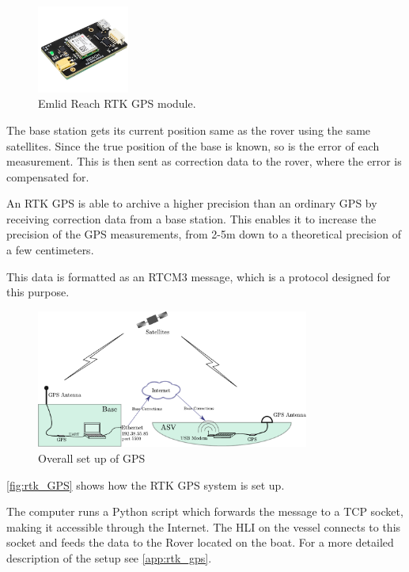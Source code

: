 \begin{figure}[H]
  \includegraphics[width=0.27\textwidth]{figures/emlidReach}
  \caption{Emlid Reach RTK GPS module.\cite{EmlidReachDocs}}
  \label{fig:emlidReach}
\end{figure}

The base station gets its current position same as the rover using the same satellites. Since the true position of the base is known, so is the error of each measurement. This is then sent as correction data to the rover, where the error is compensated for.%

An RTK GPS is able to archive a higher precision than an ordinary GPS by receiving correction data from a base station.
This enables it to increase the precision of the GPS measurements, from 2-5m down to a theoretical precision of a few centimeters.\cite{EmlidRTK}

This data is formatted as an RTCM3 message, which is a protocol designed for this purpose.\\

\begin{figure}[H]
	\includegraphics[width=0.8\textwidth]{figures/comunicationSetup.pdf}
	\caption{Overall set up of GPS}
	\label{fig:rtk_GPS}
\end{figure}
%
\autoref{fig:rtk_GPS} shows how the RTK GPS system is set up. 

The computer runs a Python script which forwards the message to a TCP socket, making it accessible through the Internet. The HLI on the vessel connects to this socket and feeds the data to the Rover located on the boat. For a more detailed description of the setup see \autoref{app:rtk_gps}.
